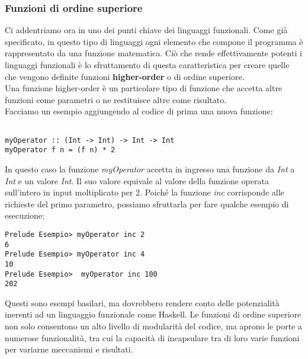 \subsubsection{Funzioni di ordine superiore}
Ci addentriamo ora in uno dei punti chiave dei linguaggi funzionali. Come già specificato, in questo tipo di linguaggi ogni elemento che compone il programma è rappresentato da una funzione matematica. Ciò che rende effettivamente potenti i linguaggi funzionali è lo sfruttamento di questa caratteristica per creare quelle che vengono definite funzioni \textbf{higher-order} o di ordine superiore.\\
Una funzione higher-order è un particolare tipo di funzione che accetta altre funzioni come parametri o ne restituisce altre come risultato.\\
Facciamo un esempio aggiungendo al codice di prima una nuova funzione:
\begin{verbatim}

myOperator :: (Int -> Int) -> Int -> Int
myOperator f n = (f n) * 2 

\end{verbatim}
In questo caso la funzione \textit{myOperator} accetta in ingresso una funzione da \textit{Int} a \textit{Int} e un valore \textit{Int}. Il suo valore equivale al valore della funzione operata sull'intero in input moltiplicato per 2. Poiché la funzione \textit{inc} corrisponde alle richieste del primo parametro, possiamo sfruttarla per fare qualche esempio di esecuzione:
\begin{verbatim}
Prelude Esempio> myOperator inc 2
6
Prelude Esempio> myOperator inc 4
10
Prelude Esempio>  myOperator inc 100
202
\end{verbatim}
Questi sono esempi basilari, ma dovrebbero rendere conto delle potenzialità inerenti ad un linguaggio funzionale come Haskell. Le funzioni di ordine superiore non solo consentono un alto livello di modularità del codice, ma aprono le porte a numerose funzionalità, tra cui la capacità di incapsulare tra di loro varie funzioni per variarne meccanismi e risultati.
